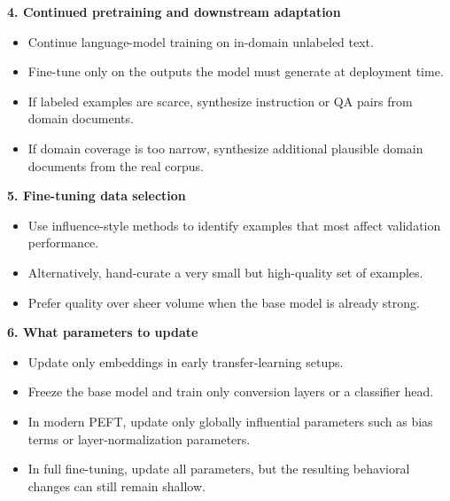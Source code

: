 \documentclass[11pt]{article}
\begin{document}
\textbf{4. Continued pretraining and downstream adaptation}
\begin{itemize}
    \item Continue language-model training on in-domain unlabeled text.
    \item Fine-tune only on the outputs the model must generate at deployment time.
    \item If labeled examples are scarce, synthesize instruction or QA pairs from domain documents.
    \item If domain coverage is too narrow, synthesize additional plausible domain documents from the real corpus.
\end{itemize}

\textbf{5. Fine-tuning data selection}
\begin{itemize}
    \item Use influence-style methods to identify examples that most affect validation performance.
    \item Alternatively, hand-curate a very small but high-quality set of examples.
    \item Prefer quality over sheer volume when the base model is already strong.
\end{itemize}

\textbf{6. What parameters to update}
\begin{itemize}
    \item Update only embeddings in early transfer-learning setups.
    \item Freeze the base model and train only conversion layers or a classifier head.
    \item In modern PEFT, update only globally influential parameters such as bias terms or layer-normalization parameters.
    \item In full fine-tuning, update all parameters, but the resulting behavioral changes can still remain shallow.
\end{itemize}
\end{document}
